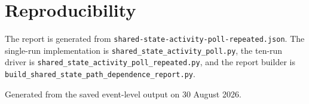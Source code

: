 \documentclass[11pt]{article}
\begin{document}
\section*{Reproducibility}

The report is generated from
\nolinkurl{shared-state-activity-poll-repeated.json}. The single-run implementation is
\nolinkurl{shared_state_activity_poll.py}, the ten-run driver is
\nolinkurl{shared_state_activity_poll_repeated.py}, and the report builder is
\nolinkurl{build_shared_state_path_dependence_report.py}.

\vfill
{\small\color{muted} Generated from the saved event-level output on 30 August 2026.}
\end{document}
